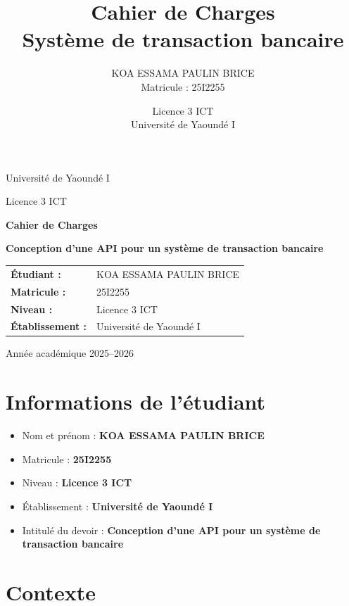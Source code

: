 \documentclass[12pt,a4paper]{article}
\title{Cahier de Charges\\\large Système de transaction bancaire}
\author{KOA ESSAMA PAULIN BRICE \\ Matricule : 25I2255}
\date{Licence 3 ICT \\ Université de Yaoundé I}
\begin{document}
\hypersetup{pageanchor=false}
\begin{titlepage}
    \centering
    {\Large Université de Yaoundé I \par}
    \vspace{0.5cm}
    {\large Licence 3 ICT \par}
    \vspace{2cm}
    {\LARGE \textbf{Cahier de Charges} \par}
    \vspace{0.5cm}
    {\Large \textbf{Conception d'une API pour un système de transaction bancaire} \par}
    \vspace{2cm}
    \begin{tabular}{>{\bfseries}p{5cm}p{8cm}}
        Étudiant : & KOA ESSAMA PAULIN BRICE \\
        Matricule : & 25I2255 \\
        Niveau : & Licence 3 ICT \\
        Établissement : & Université de Yaoundé I \\
    \end{tabular}
    \vfill
    {\large Année académique 2025--2026 \par}
\end{titlepage}
\hypersetup{pageanchor=true}

\tableofcontents
\newpage

\section*{Informations de l'étudiant}

\begin{itemize}
    \item Nom et prénom : \textbf{KOA ESSAMA PAULIN BRICE}
    \item Matricule : \textbf{25I2255}
    \item Niveau : \textbf{Licence 3 ICT}
    \item Établissement : \textbf{Université de Yaoundé I}
    \item Intitulé du devoir : \textbf{Conception d'une API pour un système de transaction bancaire}
\end{itemize}

\section{Contexte}
\end{document}

